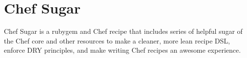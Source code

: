 \section{Chef Sugar}
\label{sec:tat-chef-sugar}

Chef Sugar is a rubygem and Chef recipe that includes series of helpful sugar of the Chef core and other resources to make a cleaner, more lean recipe DSL, enforce DRY principles, and make writing Chef recipes an awesome experience.